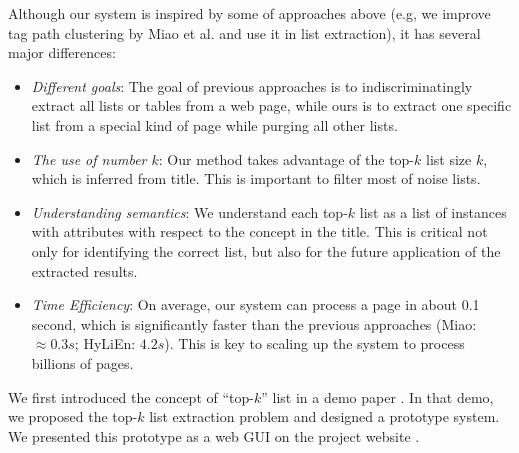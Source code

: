 Although our system is inspired by some of approaches above
(e.g, we improve tag path clustering by Miao et al. \cite{MiaoTHSM09:TagPathClustering}
and use it in list extraction), it has several major differences:
\begin{itemize}
  \item \emph{Different goals}:
  The goal of previous approaches is to indiscriminatingly extract all lists
  or tables from a web page, while ours is to extract one specific list from a special
  kind of page while purging all other lists.
  \item \emph{The use of number $k$}:
  Our method takes advantage of the top-$k$ list size $k$,
  which is inferred from title. This is important to filter most of noise lists.
  \item \emph{Understanding semantics}:
  We understand each top-$k$ list as a list of instances with attributes
  with respect to the concept in the title.
  This is critical not only for identifying the correct list, but also for
  the future application of the extracted results.
  \item \emph{Time Efficiency}:
  On average, our system can process a page in about 0.1 second,
  which is significantly faster than the previous approaches 
  (Miao\cite{MiaoTHSM09:TagPathClustering}: $\approx 0.3s$;
  HyLiEn\cite{FumarolaWBMH11:List}: $4.2s$).
  This is key to scaling up the system to process billions of pages.
\end{itemize}

We first introduced the concept of ``top-$k$'' list
in a demo paper \cite{ZZX2012KDD}.
In that demo, we proposed the top-$k$ list extraction problem
and designed a prototype system.
We presented this prototype as a web GUI
on the project website \cite{list-extractor}.

